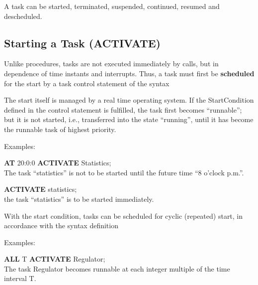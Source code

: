A task can be started, terminated, suspended, continued, resumed and
descheduled.

\subsection{Starting a Task (ACTIVATE)}   %

Unlike procedures, tasks are not executed immediately by calls, but in
dependence of time instants and interrupts. Thus, a task must first be
{\bf scheduled} for the start by a task control statement of the
syntax



The start itself is managed by a real time operating system. If
the StartCondition defined in the control statement is fulfilled,
the task first becomes ``runnable''; but it is not started, i.e.,
transferred into the state ``running'', until it has become the runnable
task of highest priority. %

Examples:

{\bf AT} 20:0:0 {\bf ACTIVATE} Statistics;\\
The task ``statistics'' is not to be started until the
future time ``8 o'clock p.m.''.

{\bf ACTIVATE} statistics;\\
the task ``statistics'' is to be started immediately.

With the start condition, tasks can be scheduled for cyclic (repeated)
start, in accordance with the syntax definition





Examples:

{\bf ALL} T {\bf ACTIVATE} Regulator;\\
The task Regulator becomes runnable at each integer
multiple of the time interval T.

